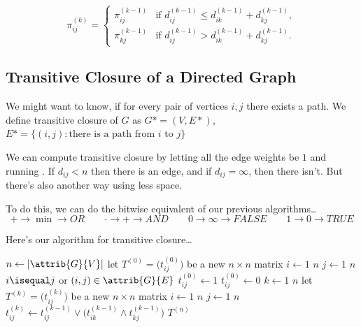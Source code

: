 \documentclass[11pt]{article}
\theoremstyle{definition}
\begin{document}
\[\pi^{(k)}_{ij} = \begin{cases}
  \pi^{(k-1)}_{ij} & \text{if } d^{(k-1)}_{ij} \leq d^{(k-1)}_{ik} + d^{(k-1)}_{kj}, \\
  \pi^{(k-1)}_{kj} & \text{if } d^{(k-1)}_{ij} > d^{(k-1)}_{ik} + d^{(k-1)}_{kj}.
\end{cases}\]

\subsection*{Transitive Closure of a Directed Graph}
We might want to know, if for every pair of vertices \(i,j\) there exists a path. We define 
transitive closure of \(G\) as \(G* = (V,E*)\), \(E* = \{(i,j): \text{there is a path from }
i \text{ to } j\}\)

We can compute transitive closure by letting all the edge weights be \(1\) and running 
.  If \(d_{ij} < n\) then there is an edge, and if \(d_{ij} = \infty\), 
then there isn't.  But there's also another way using less space.

To do this, we can do the bitwise equivalent of our previous algorithms\dots 
\[+ \rightarrow \min \rightarrow OR \quad\quad \cdot \rightarrow + \rightarrow AND \quad\quad
  0 \rightarrow \infty \rightarrow FALSE \quad\quad 1 \rightarrow 0 \rightarrow TRUE\]

Here's our algorithm for transitive closure\dots 

\begin{codebox}
  \li \(n \gets |\attrib{G}{V}|\)
  \li let \(T^{(0)} = \Big(t^{(0)}_{ij}\Big)\) be a new \(n \times n\) matrix
  \li \For \(i \gets 1\) \To \(n\) \Do
    \li \For \(j \gets 1\) \To \(n\) \Do
    \li \If \(i \isequal j\) or \((i,j) \in \attrib{G}{E}\) \Then 
      \li \(t^{(0)}_{ij} \gets 1\)
      \li \Else \(t^{(0)}_{ij} \gets 0\) \End \End \End
  \li \For \(k \gets 1\) \To \(n\) \Do
    \li let \(T^{(k)} = \Big(t^{(k)}_{ij}\Big)\) be a new \(n \times n\) matrix
    \li \For \(i \gets 1\) \To \(n\) \Do
      \li \For \(j \gets 1\) \To \(n\) \Do
        \li \(t^{(k)}_{ij} \gets t^{(k-1)}_{ij} \vee \Big(t^{(k-1)}_{ik} \wedge t^{(k-1)}_{kj}\Big)\)
        \End \End \End 
  \li \Return \(T^{(n)}\)
\end{codebox}
\end{document}
